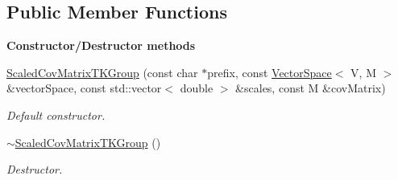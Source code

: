 \subsection*{Public Member Functions}
\begin{Indent}{\bf Constructor/\-Destructor methods}\par
\begin{DoxyCompactItemize}
\item 
\hyperlink{class_q_u_e_s_o_1_1_scaled_cov_matrix_t_k_group_a7d4bfeea785ba13d1a879e209c584a0f}{Scaled\-Cov\-Matrix\-T\-K\-Group} (const char $\ast$prefix, const \hyperlink{class_q_u_e_s_o_1_1_vector_space}{Vector\-Space}$<$ V, M $>$ \&vector\-Space, const std\-::vector$<$ double $>$ \&scales, const M \&cov\-Matrix)
\begin{DoxyCompactList}\small\item\em Default constructor. \end{DoxyCompactList}\item 
\hyperlink{class_q_u_e_s_o_1_1_scaled_cov_matrix_t_k_group_a74b0b38be315e970803b3fc65fa4e1e7}{$\sim$\-Scaled\-Cov\-Matrix\-T\-K\-Group} ()
\begin{DoxyCompactList}\small\item\em Destructor. \end{DoxyCompactList}\end{DoxyCompactItemize}
\end{Indent}

